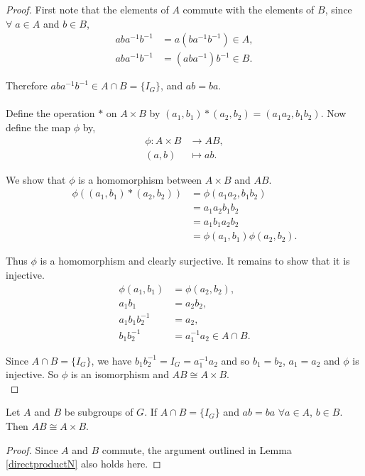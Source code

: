 \begin{proof}

First note that the elements of $A$ commute with the elements of $B$, since $\forall \; a \in A$ and $b \in B$,
\begin{align*} aba^{-1}b^{-1} &=  a(ba^{-1}b^{-1}) \in A, \tag{since $A \vartriangleleft G$}
\\ aba^{-1}b^{-1} &=  (aba^{-1})b^{-1} \in B. \tag{since $B \vartriangleleft G$}
\end{align*}

Therefore $aba^{-1}b^{-1} \in A \cap B = \{ I_G \}$, and $ab = ba$. \\
\\
Define the operation $*$ on $A \times B$ by $(a_1 , b_1)*(a_2 , b_2) = (a_1 a_2 , b_1 b_2)$. Now define the map $\phi$ by,
\begin{align*}
\phi:A \times B &\longrightarrow AB, \\
(a,b) &\longmapsto ab \tag{$\forall \; a \in A, \; b\in B$}. \end{align*}

We show that $\phi$ is a homomorphism between $A \times B$ and $AB$.
\vspace{-0.5mm}
\begin{align*}
\phi((a_1,  b_1)*(a_2, b_2)) &= \phi (a_1 a_2 , b_1 b_2) \\
&=  a_1 a_2  b_1 b_2 \\
&=  a_1 b_1 a_2 b_2  \\
&= \phi(a_1 , b_1) \phi(a_2 , b_2). \end{align*}

Thus $\phi$ is a homomorphism and clearly surjective. It remains to show that it is injective. 
\vspace{-0.5mm}
\begin{align*} \phi(a_1 , b_1) &= \phi(a_2 , b_2), \\
a_1 b_1 &= a_2 b_2, \\
a_1 b_1 b_2^{-1} &= a_2, \\
b_1 b_2^{-1} &= a_1^{-1} a_2 \in A \cap B.
\end{align*}

Since $A \cap B = \{ I_G \}$, we have $b_1 b_2^{-1} = I_G = a_1^{-1} a_2$ and so $b_1 = b_2$, $a_1 = a_2$ and $\phi$ is injective. So $\phi$ is an isomorphism and $AB \cong A \times B$.
\\
\end{proof}

\begin{lemma}\label{directproductZ}
Let $A$ and $B$ be subgroups of $G$. If $A \cap B = \{ I_G \}$ and $ab = ba$ $\forall a \in A$, $b \in B$. Then $AB \cong A \times B$.
\end{lemma}

\begin{proof} Since $A$ and $B$ commute, the argument outlined in Lemma \ref{directproductN} also holds here.
\end{proof}



